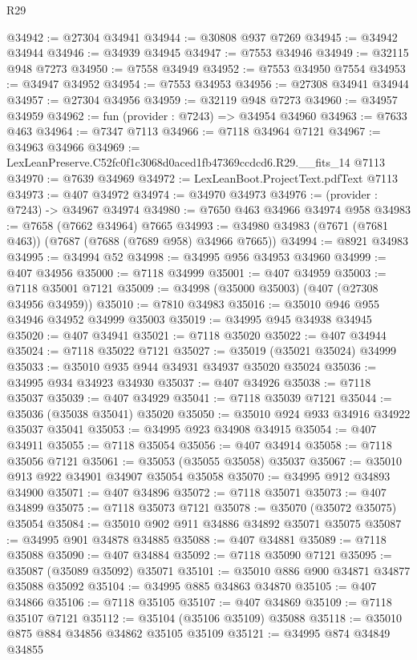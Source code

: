 \begin{lexlean}{R29}
\begin{coremodule}
@34942 := @27304 @34941
@34944 := @30808 @937 @7269
@34945 := @34942 @34944
@34946 := @34939 @34945
@34947 := @7553 @34946
@34949 := @32115 @948 @7273
@34950 := @7558 @34949
@34952 := @7553 @34950 @7554
@34953 := @34947 @34952
@34954 := @7553 @34953
@34956 := @27308 @34941 @34944
@34957 := @27304 @34956
@34959 := @32119 @948 @7273
@34960 := @34957 @34959
@34962 := fun (provider : @7243) => @34954 @34960
@34963 := @7633 @463
@34964 := @7347 @7113
@34966 := @7118 @34964 @7121
@34967 := @34963 @34966
@34969 := LexLeanPreserve.C52fc0f1c3068d0aced1fb47369ccdcd6.R29.__fits_14 @7113
@34970 := @7639 @34969
@34972 := LexLeanBoot.ProjectText.pdfText @7113
@34973 := @407 @34972
@34974 := @34970 @34973
@34976 := (provider : @7243) -> @34967 @34974
@34980 := @7650 @463 @34966 @34974 @958
@34983 := @7658 (@7662 @34964) @7665
@34993 := @34980 @34983 (@7671 (@7681 @463)) (@7687 (@7688 (@7689 @958) @34966 @7665))
@34994 := @8921 @34983
@34995 := @34994 @52
@34998 := @34995 @956 @34953 @34960
@34999 := @407 @34956
@35000 := @7118 @34999
@35001 := @407 @34959
@35003 := @7118 @35001 @7121
@35009 := @34998 (@35000 @35003) (@407 (@27308 @34956 @34959))
@35010 := @7810 @34983
@35016 := @35010 @946 @955 @34946 @34952 @34999 @35003
@35019 := @34995 @945 @34938 @34945
@35020 := @407 @34941
@35021 := @7118 @35020
@35022 := @407 @34944
@35024 := @7118 @35022 @7121
@35027 := @35019 (@35021 @35024) @34999
@35033 := @35010 @935 @944 @34931 @34937 @35020 @35024
@35036 := @34995 @934 @34923 @34930
@35037 := @407 @34926
@35038 := @7118 @35037
@35039 := @407 @34929
@35041 := @7118 @35039 @7121
@35044 := @35036 (@35038 @35041) @35020
@35050 := @35010 @924 @933 @34916 @34922 @35037 @35041
@35053 := @34995 @923 @34908 @34915
@35054 := @407 @34911
@35055 := @7118 @35054
@35056 := @407 @34914
@35058 := @7118 @35056 @7121
@35061 := @35053 (@35055 @35058) @35037
@35067 := @35010 @913 @922 @34901 @34907 @35054 @35058
@35070 := @34995 @912 @34893 @34900
@35071 := @407 @34896
@35072 := @7118 @35071
@35073 := @407 @34899
@35075 := @7118 @35073 @7121
@35078 := @35070 (@35072 @35075) @35054
@35084 := @35010 @902 @911 @34886 @34892 @35071 @35075
@35087 := @34995 @901 @34878 @34885
@35088 := @407 @34881
@35089 := @7118 @35088
@35090 := @407 @34884
@35092 := @7118 @35090 @7121
@35095 := @35087 (@35089 @35092) @35071
@35101 := @35010 @886 @900 @34871 @34877 @35088 @35092
@35104 := @34995 @885 @34863 @34870
@35105 := @407 @34866
@35106 := @7118 @35105
@35107 := @407 @34869
@35109 := @7118 @35107 @7121
@35112 := @35104 (@35106 @35109) @35088
@35118 := @35010 @875 @884 @34856 @34862 @35105 @35109
@35121 := @34995 @874 @34849 @34855

\end{coremodule}
\end{lexlean}
